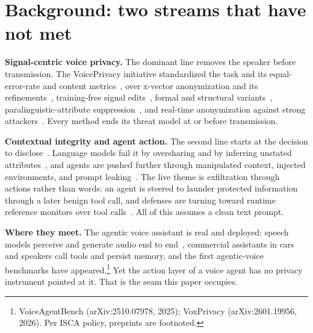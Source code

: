 \documentclass[a4paper]{article}
\begin{document}
\section{Background: two streams that have not met}
\label{sec:background}
\noindent\textbf{Signal-centric voice privacy.} The dominant line removes the speaker before transmission. The VoicePrivacy initiative standardized the task and its equal-error-rate and content metrics~\cite{tomashenko2020initiative,tomashenko2022vp2020,tomashenko2024vp2022}, over x-vector anonymization and its refinements~\cite{fang2019xvector,srivastava2022xvector,miao2023ohnn}, training-free signal edits~\cite{patino2021mcadams,mawalim2022pitch}, formal and structural variants~\cite{shamsabadi2023dpsa,maouche2022slicing}, paralinguistic-attribute suppression~\cite{pathak2013privacy,jaiswal2020privacy,stoidis2021protecting}, and real-time anonymization against strong attackers~\cite{deng2023vcloak,chen2021bob}. Every method ends its threat model at or before transmission.

\noindent\textbf{Contextual integrity and agent action.} The second line starts at the decision to disclose~\cite{nissenbaum2010privacy}. Language models fail it by oversharing and by inferring unstated attributes~\cite{mireshghallah2024confaide,staab2024beyond}, and agents are pushed further through manipulated context, injected environments, and prompt leaking~\cite{bagdasarian2024airgap,wang2025privacyaction,liao2025eia,hui2024pleak}. The live theme is exfiltration through actions rather than words: an agent is steered to launder protected information through a later benign tool call, and defenses are turning toward runtime reference monitors over tool calls~\cite{chinaei2026causality}. All of this assumes a clean text prompt.

\noindent\textbf{Where they meet.} The agentic voice assistant is real and deployed: speech models perceive and generate audio end to end~\cite{speechgpt2023}, commercial assistants in cars and speakers call tools and persist memory, and the first agentic-voice benchmarks have appeared.\footnote{VoiceAgentBench (arXiv:2510.07978, 2025); VoxPrivacy (arXiv:2601.19956, 2026). Per ISCA policy, preprints are footnoted.} Yet the action layer of a voice agent has no privacy instrument pointed at it. That is the seam this paper occupies.

\end{document}
